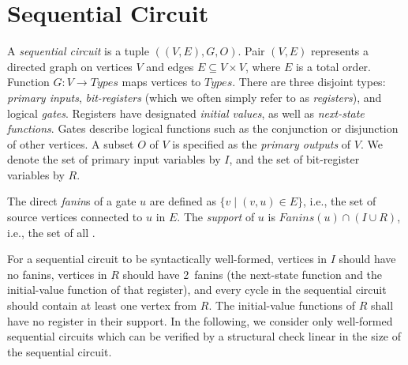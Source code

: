 \section{Sequential Circuit}
\label{sec:sequential}
%

%
\begin{definition}
A {\em sequential circuit} is a tuple $\left( (V, E),G,
O\right)$.
Pair $(V,E)$ represents a directed graph on
vertices $V$ and edges $E \subseteq V\times V$, where $E$
is a total order.  Function $G: V \to
\mathit{Types}$ maps vertices to $\mathit{Types}$.
There are three disjoint types: {\em primary inputs}, {\em
bit-registers} (which we often simply refer to as {\em
registers}), and logical {\em gates}.  Registers have designated
{\em initial values}, as well as {\em next-state
functions}.  Gates describe logical functions such as
the conjunction or disjunction of other vertices. 
A subset $O$ of $V$ is specified as the {\em
primary outputs} of $V$.  
We denote the set of primary input variables by $I$,
and the set of bit-register variables by $R$.  
\label{def:back:seq_circuit}
\end{definition}
%
\begin{definition}
The direct \emph{fanin}s of a gate $u$ 
are defined as
$\{v \mid (v,u)\in E\}$, i.e., the set of source vertices connected
to $u$ in $E$.  
The {\em support} of $u$ 
is $\mathit{Fanins}(u) \cap (I \cup R)$, i.e., the set of all 
  .
\label{def:back:fanins} 
\end{definition}
%
%
For a sequential
circuit to be syntactically well-formed, vertices in $I$
should have no fanins, vertices in $R$ should have
2~fanins (the next-state function and the initial-value
function of that register), %
and every cycle in the sequential circuit should contain
at least one vertex from $R$.  The initial-value functions
of $R$ shall have no register in their support.  
In the following, 
we consider only well-formed sequential circuits which can be 
verified by a structural check linear in the size of the 
sequential circuit.
%


